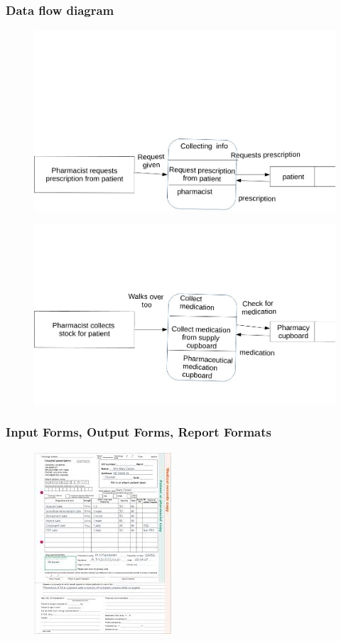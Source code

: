 \subsubsection{Data flow diagram}
\begin{figure}[ht!]
\centering
\includegraphics[trim = 0mm 0mm 0mm 5cm , clip, width=130mm]{dfd.JPG}
\end{figure}
\begin{figure}[ht!]
\centering
\includegraphics[trim = 0mm 0mm 0mm 5cm , clip, width=130mm]{dfd3.JPG}
\end{figure}
\pagebreak
\subsubsection{Input Forms, Output Forms, Report Formats}
\begin{figure}[ht!]
\centering
\includegraphics[scale = 1.5]{hospital pres.JPG}
\end{figure}
\pagebreak
